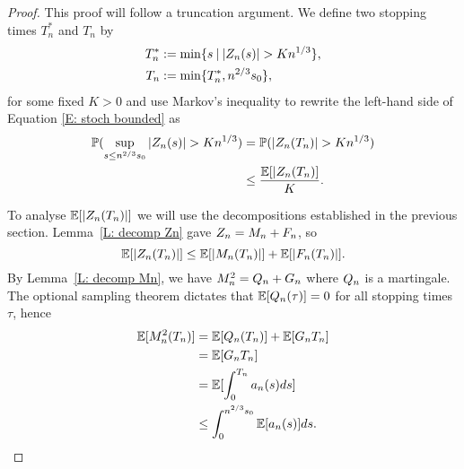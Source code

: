 \begin{proof}
	This proof will follow a truncation argument.
	We define two stopping times $T^*_n$ and $T_n$ by
	\begin{align} 
		T^*_n &:= \min \lbrace s \: | \: |Z_n(s)| > K n^{1 / 3} \rbrace, \label{E: def T*n} \\
		T_n &:= \min \lbrace T^*_n, n^{2 / 3}s_0 \rbrace ,  \label{E: def Tn}
	\end{align}
	for some fixed $K>0$ and use Markov's inequality to rewrite the left-hand side of Equation \eqref{E: stoch bounded} as
	\begin{equation} \label{E: stoch bounded 2}
	\begin{aligned}
	\mathbb{P}( \sup_{s\leq n^{2/3} s_0} |Z_n(s)| > K n^{1 / 3} ) &= \mathbb{P}( |Z_n(T_n)| > Kn^{1 / 3} ) \\
	&\leq \frac{\mathbb{E}[|Z_n(T_n)]}{K}.
	\end{aligned} 
	\end{equation}
	
	To analyse $\mathbb{E}[|Z_n(T_n)|]$ we will use the decompositions established in the previous section. 
	Lemma~\ref{L: decomp Zn} gave $Z_n = M_n + F_n$,
	so \begin{equation} \label{E: Exp(|Zn|)}
	\mathbb{E}[|Z_n(T_n)|] \leq \mathbb{E}[|M_n(T_n)|] + \mathbb{E}[|F_n(T_n)|].
	\end{equation}
	By Lemma~\ref{L: decomp Mn}, we have $M^2_n = Q_n + G_n$ where $Q_n$ is a martingale. 
	The optional sampling theorem dictates that 
	$\mathbb{E}[Q_n(\tau)] = 0$ 
	for all stopping times $\tau$, hence 
	\begin{align*}
		\mathbb{E}[M^2_n(T_n)] 
		&= \mathbb{E}[Q_n(T_n)] + \mathbb{E}[G_n{T_n}] \\
		&= \mathbb{E}[G_n{T_n}] \\
		&= \mathbb{E}[ \int_{0}^{T_n} a_n(s)ds ] \\
		&\leq \int_{0}^{n^{2 / 3}s_0} \mathbb{E}[a_n(s)] ds.
	\end{align*}
	

\end{proof}
